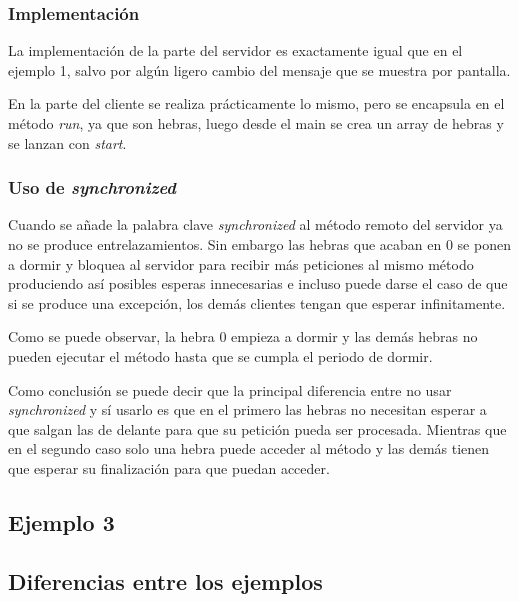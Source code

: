 \documentclass{article}
\begin{document}
\subsubsection{Implementación}
La implementación de la parte del servidor es exactamente igual que en el ejemplo 1, salvo por algún ligero cambio del mensaje que se muestra por pantalla.


En la parte del cliente se realiza prácticamente lo mismo, pero se encapsula en el método \textit{run}, ya que son hebras, luego desde el main se crea un array de hebras y se lanzan con \textit{start}.

\subsubsection{Uso de \textit{synchronized}}
Cuando se añade la palabra clave \textit{synchronized} al método remoto del servidor ya no se produce entrelazamientos. Sin embargo las hebras que acaban en 0 se ponen a dormir y bloquea al servidor para recibir más peticiones al mismo método produciendo así posibles esperas innecesarias e incluso puede darse el caso de que si se produce una excepción, los demás clientes tengan que esperar infinitamente. 

Como se puede observar, la hebra 0 empieza a dormir y las demás hebras no pueden ejecutar el método hasta que se cumpla el periodo de dormir.

Como conclusión se puede decir que la principal diferencia entre no usar \textit{synchronized} y sí usarlo es que en el primero las hebras no necesitan esperar a que salgan las de delante para que su petición pueda ser procesada. Mientras que en el segundo caso solo una hebra puede acceder al método y las demás tienen que esperar su finalización para que puedan acceder.



\subsection{Ejemplo 3}

\subsection{Diferencias entre los ejemplos}
\end{document}
